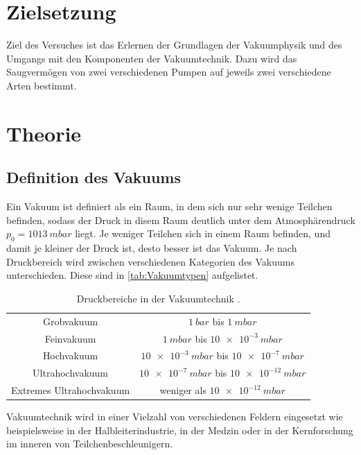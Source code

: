 \section{Zielsetzung}
Ziel des Versuches ist das Erlernen der Grundlagen der Vakuumphysik und des Umgangs mit den Komponenten der Vakuumtechnik.
Dazu wird das Saugvermögen von zwei verschiedenen Pumpen auf jeweils zwei verschiedene Arten bestimmt.

\section{Theorie}
\label{sec:Theorie}
\subsection{Definition des Vakuums}
Ein Vakuum ist definiert als ein Raum, in dem sich nur sehr wenige Teilchen befinden, sodass der Druck in disem Raum deutlich unter dem Atmosphärendruck $p_0 = \SI{1013}{mbar}$ liegt.
Je weniger Teilchen sich in einem Raum befinden, und damit je kleiner der Druck ist, desto besser ist das Vakuum.
Je nach Druckbereich wird zwischen verschiedenen Kategorien des Vakuums unterschieden. Diese sind in \autoref{tab:Vakuumtypen} aufgelistet.

\begin{table}
	\centering
	\caption{Druckbereiche in der Vakuumtechnik \cite{V070_glossar}.}
	\label{tab:Vakuumtypen}
	\begin{tabular}{| c | c |}
		\midrule
            Grobvakuum & $\SI{1}{bar}$ bis  $\SI{1}{mbar}$ \\
            Feinvakuum & $\SI{1}{mbar}$ bis  $\SI{10e-3}{mbar}$ \\
            Hochvakuum & $\SI{10e-3}{mbar}$ bis  $\SI{10e-7}{mbar}$ \\
            Ultrahochvakuum & $\SI{10e-7}{mbar}$ bis  $\SI{10e-12}{mbar}$ \\
            Extremes Ultrahochvakuum & weniger als $\SI{10e-12}{mbar}$ \\
		\bottomrule
	\end{tabular}
\end{table}

Vakuumtechnik wird in einer Vielzahl von verschiedenen Feldern eingesetzt wie beispielsweise in der Halbleiterindustrie, in der Medzin oder in der Kernforschung
im inneren von Teilchenbeschleunigern.\cite{V070_glossar}

